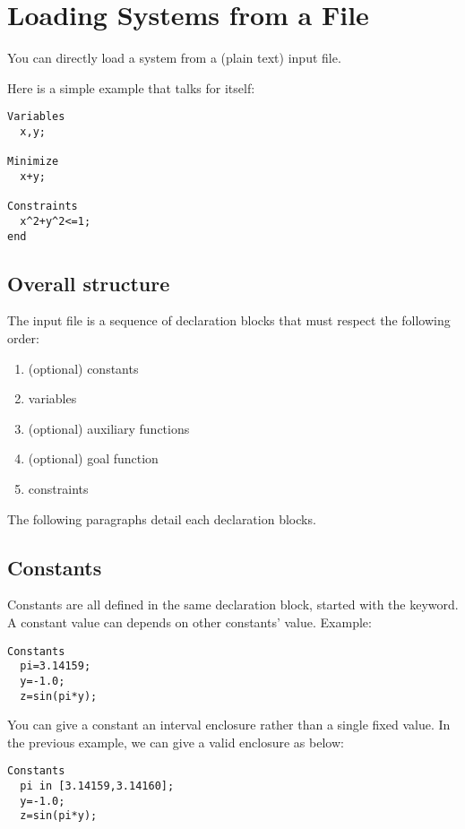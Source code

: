 \section{Loading Systems from a File}\label{sec:mod-sys-load}

You can directly load a system from a (plain text) input file.

Here is a simple example that talks for itself:

\begin{verbatim}
Variables
  x,y;

Minimize
  x+y;

Constraints
  x^2+y^2<=1;
end
\end{verbatim}

\subsection{Overall structure}
The input file is a sequence of declaration blocks that must respect the following order:
\begin{enumerate}
\item (optional) constants
\item variables
\item (optional) auxiliary functions
\item (optional) goal function
\item constraints
\end{enumerate}

The following paragraphs detail each declaration blocks.

\subsection{Constants}
Constants are all defined in the same declaration block, 
started with the  keyword.
A constant value can depends on other constants' value. Example:

\begin{verbatim}
Constants
  pi=3.14159;
  y=-1.0;
  z=sin(pi*y);
\end{verbatim} 

You can give a constant an interval enclosure rather than a single fixed value.
In the previous example, we can give  a valid enclosure as below:

\begin{verbatim}
Constants
  pi in [3.14159,3.14160];
  y=-1.0;
  z=sin(pi*y);
\end{verbatim}

